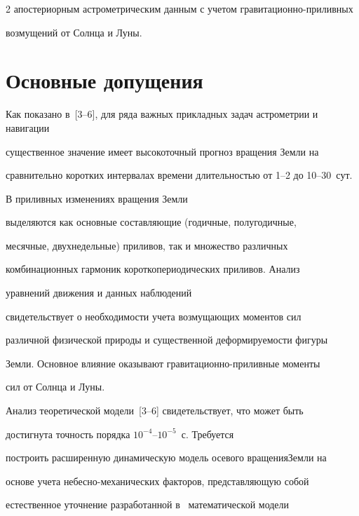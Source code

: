\begin{multicols}{2}
апостериорным астрометрическим данным с учетом гра\-ви\-та\-ци\-он\-но-при\-лив\-ных 


возмущений от Солнца и Луны.





\section{Основные допущения}





Как показано в~[3--6], для ряда важных прикладных задач астрометрии и навигации


существенное значение имеет высокоточный прогноз вращения Земли на


сравнительно коротких интервалах времени длительностью от 1--2 до 10--30~сут.





В приливных изменениях вращения Земли


выделяются как основные составляющие (годичные, полугодичные,


месячные, двухнедельные) приливов, так и множество различных


комбинационных гармоник короткопериодических приливов. Анализ


уравнений движения и данных наблюдений


свидетельствует о необходимости учета воз\-му\-ща\-ющих моментов сил


различной физической природы и существенной деформируемости фигуры


Земли. Основное влияние оказывают гра\-ви\-та\-ци\-он\-но-при\-лив\-ные моменты


сил от Солнца и Луны.





Анализ теоретической модели~[3--6] свидетельствует, что может быть


достигнута точность порядка $10^{-4}\mbox{--}10^{-5}$~с. Требуется


построить расширенную динамическую модель осевого вращения\linebreak Земли на


основе учета небесно-ме\-ха\-ни\-че\-ских факторов, представляющую собой


естественное уточнение разработанной в~\cite{5-mar} математической модели



\end{multicols}
